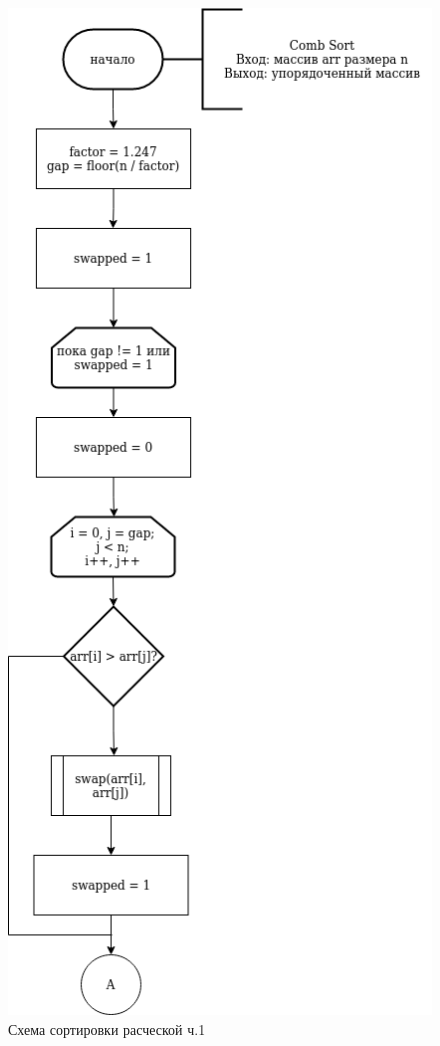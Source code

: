 \documentclass[12pt]{report}
\begin{document}
	\begin{figure}[H]
		\centering
		\includegraphics[width=0.5\linewidth]{combSort_1}
		\caption{Схема сортировки расческой ч.1}
		\label{fig:schema_selection}
	\end{figure}
	
\end{document}
